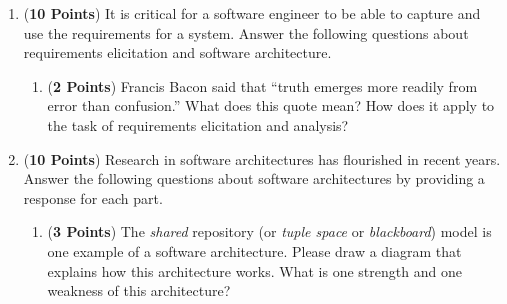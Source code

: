 \documentclass[12pt,epsf,psfig,graphics]{article}
\begin{document}
\begin{enumerate}
\newpage

\item ({\bf 10 Points}) It is critical for a software engineer to be able to capture and use the requirements for a 
	system.  Answer the following questions about requirements elicitation and software architecture.

\begin{enumerate}

\item ({\bf 2 Points}) Francis Bacon said that ``truth emerges more
  readily from error than confusion.''  What does this quote mean?
  How does it apply to the task of requirements elicitation and
  analysis?

% 

% 
\end{enumerate}

\newpage

\item ({\bf 10 Points}) Research in software architectures has
  flourished in recent years.  Answer the following questions about
  software architectures by providing a response for each part.

\begin{enumerate}

% 
\item ({\bf 3 Points}) The {\em shared} repository (or {\em tuple
  space} or {\em blackboard}) model is one example of a software
  architecture.  Please draw a diagram that explains how this
  architecture works.  What is one strength and one weakness of this
  architecture?


\end{enumerate}
\end{enumerate}
\end{document}
